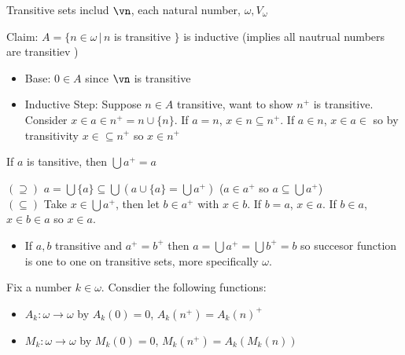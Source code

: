 \begin{example}
    Transitive sets includ $\vn$, each natural number, $\omega, V_{\omega}$ 
\end{example}

\noindent
Claim: $A = \{ n \in \omega \, | \, n$ is transitive $\}$ is inductive (implies all nautrual numbers are transitiev ) 
\begin{itemize}
    \item Base: $0 \in A$ since $\vn$ is transitive 
    \item Inductive Step: Suppose $n \in A$ transitive, want to show $n^+$ is transitive. \\
    Consider $x \in a \in n^+ = n \cup \{n\}$. If $a=n$, $x \in n \subseteq n^+$. If $a \in n$, $x \in a \in$ so by transitivity $x \in \subseteq n^+$ so $x \in n^+$ 
\end{itemize}

\begin{theorem}
    If $a$ is tansitive, then $\bigcup a^+ = a$ 
\end{theorem}

\begin{pf}
    $(\supseteq)$ $a = \bigcup \{a\} \subseteq \bigcup ( a \cup \{a\} = \bigcup a^+)$ ($a \in a^+$ so $a \subseteq \bigcup a^+$)\\
    $(\subseteq)$ Take $x \in \bigcup a^+$, then let $b \in a^+$ with $x \in b$. If $b=a$, $x \in a$. If $b \in a$, $x \in b \in a$ so $x \in a$. 
\end{pf}

\begin{itemize}
    \item If $a,b$ transitive and $a^+ = b^+$ then $a = \bigcup a^+ = \bigcup b^+ = b$ so succesor function is one to one on transitive sets, more specifically $\omega$. 
\end{itemize}

\noindent
Fix a number $k \in \omega$. Consdier the following functions: 
\begin{itemize}
    \item $A_k : \omega \to \omega$ by $A_k(0)=0$, $A_k(n^+) = A_k(n)^+$ 
    \item $M_k : \omega \to \omega$ by $M_k(0)=0$, $M_k(n^+) = A_k(M_k(n))$
\end{itemize}

